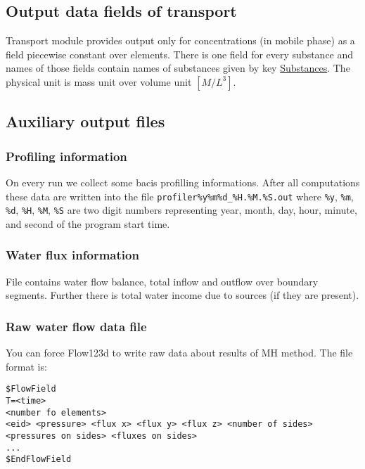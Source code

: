 \subsection{Output data fields of transport}
Transport module provides output only for concentrations (in mobile phase) as a field piecewise constant over elements. There is one field for every substance and names of those fields contain 
names of substances given by key \hyperlink{KeySubstanceNames}{Substances}. The physical unit is mass unit over volume unit $[M / L^3]$.





\subsection{Auxiliary output files}

\subsubsection{Profiling information}
On every run we collect some bacis profilling informations. After all computations these data are written into the file
\verb'profiler%y%m%d_%H.%M.%S.out' where \verb'%y', \verb'%m', \verb'%d', \verb'%H', \verb'%M', \verb'%S' are 
two digit numbers representing year, month, day, hour, minute, and second of the program start time.

\subsubsection{Water flux information}
File contains water flow balance, total inflow and outflow over boundary segments. 
Further there is total water income due to sources (if they are present).


\subsubsection{Raw water flow data file}
You can force Flow123d to write raw data about results of MH method. The file format is:
\begin{verbatim}
$FlowField
T=<time>
<number fo elements>
<eid> <pressure> <flux x> <flux y> <flux z> <number of sides> <pressures on sides> <fluxes on sides> 
...
$EndFlowField
\end{verbatim}

